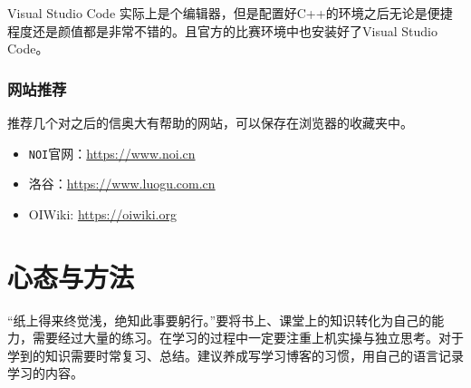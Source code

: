Visual Studio Code 实际上是个编辑器，但是配置好C++的环境之后无论是便捷程度还是颜值都是非常不错的。且官方的比赛环境中也安装好了Visual Studio Code。

\subsubsection{网站推荐}
推荐几个对之后的信奥大有帮助的网站，可以保存在浏览器的收藏夹中。
\begin{itemize}
\item \texttt{NOI}官网：\href{https://www.noi.cn}{https://www.noi.cn}
\item 洛谷：\href{https://www.luogu.com.cn}{https://www.luogu.com.cn}
\item OIWiki: \href{https://oiwiki.org}{https://oiwiki.org}
\end{itemize}

\section{心态与方法}
“纸上得来终觉浅，绝知此事要躬行。”要将书上、课堂上的知识转化为自己的能力，需要经过大量的练习。在学习的过程中一定要注重上机实操与独立思考。对于学到的知识需要时常复习、总结。建议养成写学习博客的习惯，用自己的语言记录学习的内容。


